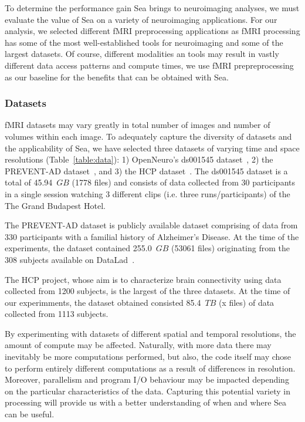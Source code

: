 \documentclass[10pt,journal,compsoc]{IEEEtran}
\begin{document}
To determine the performance gain Sea brings to neuroimaging analyses, we must evaluate the value of Sea on a variety of neuroimaging
applications. For our analysis, we selected different fMRI preprocessing applications as fMRI processing has some of the most
well-established tools for neuroimaging and some of the largest datasets. Of course, different modalities an tools may result in
vastly different data access patterns and compute times, we use fMRI prepreprocessing as our baseline for the benefits that can be
obtained with Sea. 



\subsubsection{Datasets}
fMRI datasets may vary greatly in total number
of images and number of volumes within each image. To adequately capture the 
diversity of datasets and the applicability of Sea, we have selected three datasets of varying
time and space resolutions (Table~\ref{table:data}): 1) OpenNeuro's ds001545 dataset~\cite{ds001545},
2) the PREVENT-AD dataset~\cite{preventad}, and 3) the HCP dataset~\cite{hcp}.
The ds001545 dataset is a total of 45.94~$GB$ (1778 files) and consists of data collected
from 30 participants in a single session watching 3 different clips (i.e. three runs/participants) of the The Grand Budapest Hotel.


The PREVENT-AD dataset is publicly available dataset comprising of data from 330 participants with a familial history
of Alzheimer's Disease.
At the time of the experiments, the dataset contained 255.0~$GB$ (53061 files) originating from the 308 subjects available on DataLad~\cite{}.

The HCP project, whose aim is to characterize brain connectivity using data collected from 1200 subjects, is the largest of the three datasets.
At the time of our experimments, the dataset obtained consisted 85.4~$TB$ (x files) of data collected from 1113 subjects.

By experimenting with datasets of different spatial and temporal resolutions, the amount of compute may be affected.
Naturally, with more data there may inevitably be more computations performed, but also, the code itself may
chose to perform entirely different computations as a result of differences in resolution. Moreover, parallelism and program I/O behaviour
may be impacted depending on the particular characteristics of the data. Capturing this potential
variety in processing will provide us with a better understanding of when and where Sea can be useful.
\end{document}
